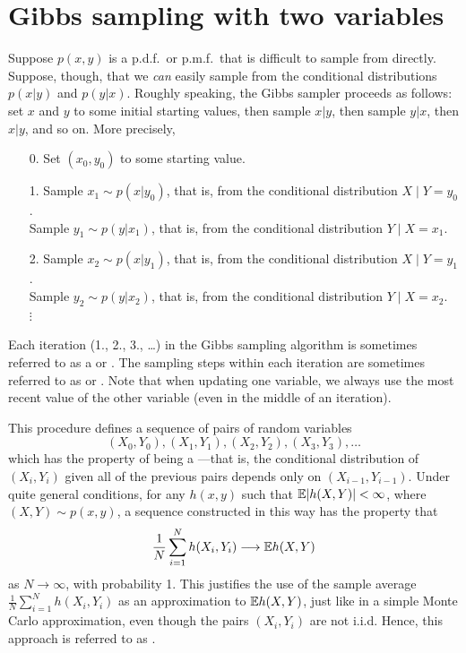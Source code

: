 \documentclass[12pt]{article}
\begin{document}
\section{Gibbs sampling with two variables}
\label{section:Gibbs-sampling-with-two-variables}

Suppose $p(x,y)$ is a p.d.f.\ or p.m.f.\ that is difficult to sample from directly.  Suppose, though, that we \textit{can} easily sample from the conditional distributions $p(x|y)$ and $p(y|x)$.  Roughly speaking, the Gibbs sampler proceeds as follows: set $x$ and $y$ to some initial starting values, then sample $x|y$, then sample $y|x$, then $x|y$, and so on. More precisely,
\begin{enumerate}
\item[0.] Set $(x_0,y_0)$ to some starting value.
\item[1.] Sample $x_1\sim p(x|y_0)$, that is, from the conditional distribution $X\mid Y=y_0$. \\
          Sample $y_1\sim p(y|x_1)$, that is, from the conditional distribution $Y\mid X=x_1$.
\item[2.] Sample $x_2\sim p(x|y_1)$, that is, from the conditional distribution $X\mid Y=y_1$. \\
          Sample $y_2\sim p(y|x_2)$, that is, from the conditional distribution $Y\mid X=x_2$. \\
        $\vdots$
\end{enumerate}
Each iteration (1., 2., 3., \dots) in the Gibbs sampling algorithm is sometimes referred to as a  or .
The sampling steps within each iteration are sometimes referred to as  or .
Note that when updating one variable, we always use the most recent value of the other variable (even in the middle of an iteration).

This procedure defines a sequence of pairs of random variables
$$ (X_0,Y_0), (X_1,Y_1), (X_2,Y_2), (X_3,Y_3), \ldots$$
which has the property of being a ---that is, the conditional distribution of $(X_i,Y_i)$ given all of the previous pairs depends only on $(X_{i-1},Y_{i-1})$. Under quite general conditions, for any $h(x,y)$ such that $\mathbb{E}|h(X,Y)|<\infty$, where $(X,Y)\sim p(x,y)$, a sequence constructed in this way has the property that
\begin{align*}
\frac{1}{N}\sum_{i = 1}^N h(X_i,Y_i) \longrightarrow \mathbb{E} h(X,Y)
\end{align*}
as $N\to \infty$, with probability 1. This justifies the use of the sample average $\frac{1}{N}\sum_{i = 1}^N h(X_i,Y_i)$ as an approximation to $\mathbb{E} h(X,Y)$, just like in a simple Monte Carlo approximation, even though the pairs $(X_i,Y_i)$ are not i.i.d. Hence, this approach is referred to as .
\end{document}
